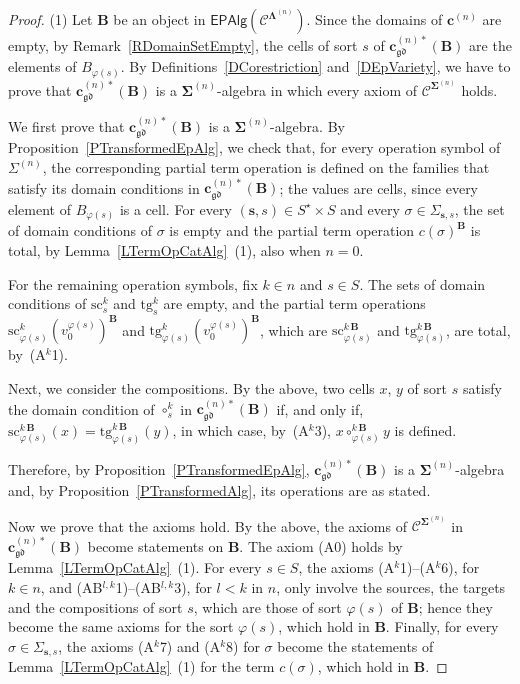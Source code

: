 \documentclass[a4paper, reqno]{amsbook}
\newcommand{\sig}[1]{\mathbf{#1}}             %
\newcommand{\spec}[1]{\boldsymbol{\mathcal{#1}}} %
\newcommand{\gd}{\mathfrak{gd}}              %
\newcommand{\src}{\mathrm{sc}}
\newcommand{\tgt}{\mathrm{tg}}
\theoremstyle{plain}
\theoremstyle{definition}
\begin{document}
\begin{proof}
(1) Let $\mathbf{B}$ be an object in $\mathsf{EPAlg}(\spec{C}^{\sig{\Lambda}^{(n)}})$.
Since the domains of $\mathbf{c}^{(n)}$ are empty, by Remark~\ref{RDomainSetEmpty}, the cells of sort $s$ of $\mathbf{c}^{(n)\ast}_{\gd}(\mathbf{B})$ are the elements of $B_{\varphi(s)}$.
By Definitions~\ref{DCorestriction} and~\ref{DEpVariety}, we have to prove that $\mathbf{c}^{(n)\ast}_{\gd}(\mathbf{B})$ is a $\sig{\Sigma}^{(n)}$-algebra in which every axiom of $\mathcal{C}^{\sig{\Sigma}^{(n)}}$ holds.

We first prove that $\mathbf{c}^{(n)\ast}_{\gd}(\mathbf{B})$ is a $\sig{\Sigma}^{(n)}$-algebra.
By Proposition~\ref{PTransformedEpAlg}, we check that, for every operation symbol of $\Sigma^{(n)}$, the corresponding partial term operation is defined on the families that satisfy its domain conditions in $\mathbf{c}^{(n)\ast}_{\gd}(\mathbf{B})$; the values are cells, since every element of $B_{\varphi(s)}$ is a cell.
For every $(\mathbf{s},s)\in S^{\star}\times S$ and every $\sigma\in\Sigma_{\mathbf{s},s}$, the set of domain conditions of $\sigma$ is empty and the partial term operation $c(\sigma)^{\mathbf{B}}$ is total, by Lemma~\ref{LTermOpCatAlg}~(1), also when $n=0$.

For the remaining operation symbols, fix $k\in n$ and $s\in S$.
The sets of domain conditions of $\src^{k}_{s}$ and $\tgt^{k}_{s}$ are empty, and the partial term operations $\src^k_{\varphi(s)}(v^{\varphi(s)}_0)^{\mathbf{B}}$ and $\tgt^k_{\varphi(s)}(v^{\varphi(s)}_0)^{\mathbf{B}}$, which are $\src^{k\,\mathbf{B}}_{\varphi(s)}$ and $\tgt^{k\,\mathbf{B}}_{\varphi(s)}$, are total, by~(A$^k$1).

Next, we consider the compositions.
By the above, two cells $x$, $y$ of sort $s$ satisfy the domain condition of $\circ^{k}_{s}$ in $\mathbf{c}^{(n)\ast}_{\gd}(\mathbf{B})$ if, and only if, $\src^{k\,\mathbf{B}}_{\varphi(s)}(x)=\tgt^{k\,\mathbf{B}}_{\varphi(s)}(y)$, in which case, by~(A$^{k}$3), $x\circ^{k\,\mathbf{B}}_{\varphi(s)}y$ is defined.

Therefore, by Proposition~\ref{PTransformedEpAlg}, $\mathbf{c}^{(n)\ast}_{\gd}(\mathbf{B})$ is a $\sig{\Sigma}^{(n)}$-algebra and, by Proposition~\ref{PTransformedAlg}, its operations are as stated.

Now we prove that the axioms hold.
By the above, the axioms of $\spec{C}^{\sig{\Sigma}^{(n)}}$ in $\mathbf{c}^{(n)\ast}_{\gd}(\mathbf{B})$ become statements on $\mathbf{B}$.
The axiom (A0) holds by Lemma~\ref{LTermOpCatAlg}~(1).
For every $s\in S$, the axioms (A$^{k}$1)--(A$^{k}$6), for $k\in n$, and (AB$^{l,k}$1)--(AB$^{l,k}$3), for $l<k$ in $n$, only involve the sources, the targets and the compositions of sort $s$, which are those of sort $\varphi(s)$ of $\mathbf{B}$; hence they become the same axioms for the sort $\varphi(s)$, which hold in $\mathbf{B}$.
Finally, for every $\sigma\in\Sigma_{\mathbf{s},s}$, the axioms (A$^{k}$7) and (A$^{k}$8) for $\sigma$ become the statements of Lemma~\ref{LTermOpCatAlg}~(1) for the term $c(\sigma)$, which hold in $\mathbf{B}$.


\end{proof}
\end{document}
